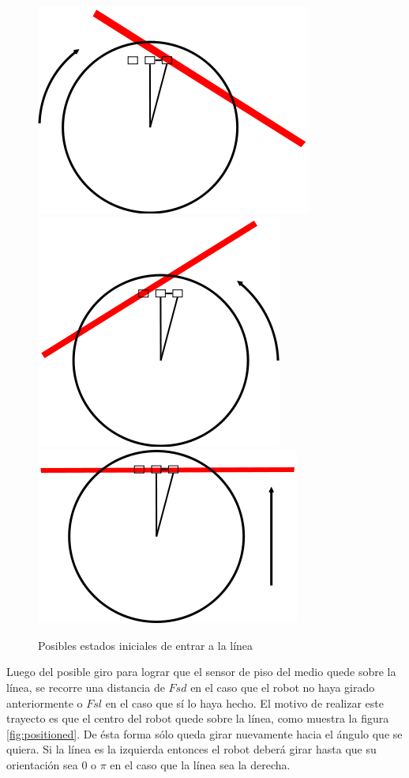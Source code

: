 \begin{figure}[htp]
\begin{center}
\includegraphics[scale=0.4]{comportamientos/floorSensorsLine.png}
\includegraphics[scale=0.4]{comportamientos/floorSensorsLine1.png}
\includegraphics[scale=0.4]{comportamientos/floorSensorsLine2.png}
\caption{Posibles estados iniciales de entrar a la l\'inea}
\label{fig:floorSensorsStates}
\end{center}
\end{figure}


Luego del posible giro para lograr que el sensor de piso del medio quede sobre
la l\'inea, se recorre una distancia de $Fsd$ en el caso que el robot no haya
girado anteriormente o $Fsl$ en el caso que s\'i lo haya hecho. El motivo de
realizar este trayecto es que el centro del robot quede sobre la l\'inea, como
muestra la figura \ref{fig:positioned}. De \'esta forma s\'olo queda girar
nuevamente hacia el \'angulo que se quiera. Si la l\'inea es la izquierda
entonces el robot deber\'a girar hasta que su orientaci\'on sea $0$ o $\pi$ en
el caso que la l\'inea sea la derecha.

